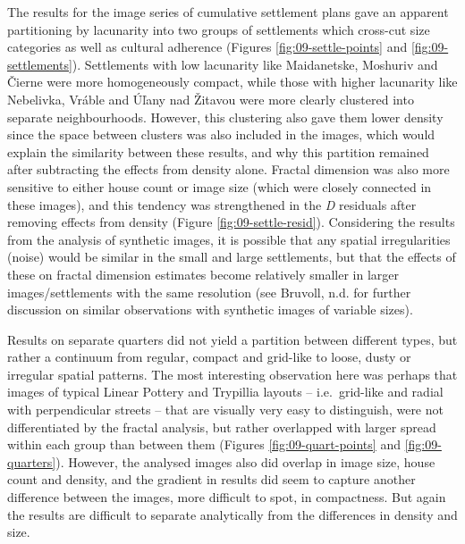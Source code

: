 \documentclass[
  12pt,
  a4paper, twoside]{book}
\begin{document}
The results for the image series of cumulative settlement plans gave an apparent partitioning by lacunarity into two groups of settlements which cross-cut size categories as well as cultural adherence (Figures \ref{fig:09-settle-points} and \ref{fig:09-settlements}). Settlements with low lacunarity like Maidanetske, Moshuriv and Čierne were more homogeneously compact, while those with higher lacunarity like Nebelivka, Vráble and Úľany nad Žitavou were more clearly clustered into separate neighbourhoods. However, this clustering also gave them lower density since the space between clusters was also included in the images, which would explain the similarity between these results, and why this partition remained after subtracting the effects from density alone. Fractal dimension was also more sensitive to either house count or image size (which were closely connected in these images), and this tendency was strengthened in the \emph{D} residuals after removing effects from density (Figure \ref{fig:09-settle-resid}). Considering the results from the analysis of synthetic images, it is possible that any spatial irregularities (noise) would be similar in the small and large settlements, but that the effects of these on fractal dimension estimates become relatively smaller in larger images/settlements with the same resolution (see Bruvoll, n.d. for further discussion on similar observations with synthetic images of variable sizes).

Results on separate quarters did not yield a partition between different types, but rather a continuum from regular, compact and grid-like to loose, dusty or irregular spatial patterns. The most interesting observation here was perhaps that images of typical Linear Pottery and Trypillia layouts -- i.e.~grid-like and radial with perpendicular streets -- that are visually very easy to distinguish, were not differentiated by the fractal analysis, but rather overlapped with larger spread within each group than between them (Figures \ref{fig:09-quart-points} and \ref{fig:09-quarters}). However, the analysed images also did overlap in image size, house count and density, and the gradient in results did seem to capture another difference between the images, more difficult to spot, in compactness. But again the results are difficult to separate analytically from the differences in density and size.
\end{document}
